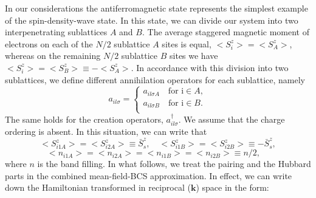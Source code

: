 \documentclass[aps,prb,showpacs,reprint]{revtex4-1}
\begin{document}
In our considerations the antiferromagnetic state represents the simplest
example of
the spin-density-wave state. In this state, we can divide our system into two
interpenetrating sublattices $A$ and $B$. The average staggered magnetic moment
of electrons on
each of the $N/2$ sublattice $A$ sites is equal, $<S_i^z>=<S^z_A> $, whereas
on the remaining $N/2$ sublattice $B$ sites we have $<S_i^z>=<S^z_B>\equiv
-<S^z_A>$.
In accordance with this division into two sublattices, we define different
annihilation operators for each sublattice, namely
\begin{equation}
a_{il\sigma}=\left\{\begin{array}{cl}
a_{il\sigma A} \quad \textrm{for i} \in A,\\
a_{il\sigma B} \quad \textrm{for i} \in B.\\
\end{array}\right.
\end{equation}
The same holds for the creation operators, $a^{\dagger}_{il\sigma}$. We assume that the charge ordering is absent. In this situation, we can write that
\begin{equation}
 <S^z_{i1A}>=<S^z_{i2A}>\equiv \bar{S}^z_{s}, \quad
 <S^z_{i1B}>=<S^z_{i2B}>\equiv -\bar{S}^z_{s},
\end{equation}
\begin{equation}
 <n_{i1A}>=<n_{i2A}>=<n_{i1B}>=<n_{i2B}>\equiv n/2, \quad
\end{equation}
where $n$ is the band filling.
In what follows, we treat the pairing and the Hubbard parts in the combined mean-field-BCS
approximation. In effect, we can write down the Hamiltonian transformed in reciprocal ($\mathbf{k}$) space in
the form:
\end{document}
